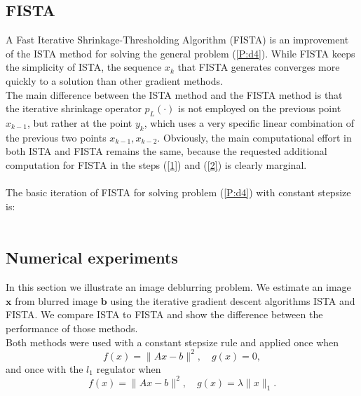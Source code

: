 \documentclass[12pt]{article}
\begin{document}
\subsection{FISTA}
A Fast Iterative Shrinkage-Thresholding Algorithm (FISTA) is an improvement of the ISTA method for solving the general problem (\ref{P:d4}).
While FISTA keeps the simplicity of ISTA, the sequence ${x_k}$ that FISTA generates converges more quickly to a solution than other gradient methods.\\
The main difference between the ISTA method and the FISTA method is that the iterative shrinkage
operator $p_L(·)$ is not employed on the previous point $x_{k-1}$, but rather at the point $y_k$, which
uses a very specific linear combination of the previous two points $x_{k−1}, x_{k−2}$. 
Obviously, the main computational effort in both ISTA and FISTA remains the same, 
because the requested additional computation for FISTA in the steps (\ref{1}) and (\ref{2}) is
clearly marginal.\\
\\The basic iteration of FISTA for solving problem (\ref{P:d4}) with constant stepsize is:\\
\\
\subsection{Numerical experiments}
In this section we illustrate an image deblurring problem. We estimate an image $\boldsymbol{x}$ from blurred image $\boldsymbol{b}$ using the iterative gradient descent algorithms ISTA and FISTA. We compare ISTA to FISTA and show the difference between the performance of those methods.\\
Both methods were used  with a constant stepsize rule and applied once when 
\begin{equation}\label{P:e1}
f(x) = \|Ax-b\|^2, \quad g(x)=0,
\end{equation}
and once with the $l_1$ regulator when 
\begin{equation}\label{P:e2}
f(x) = \|Ax-b\|^2, \quad g(x)=\lambda \|x\|_1.
\end{equation}
\end{document}
